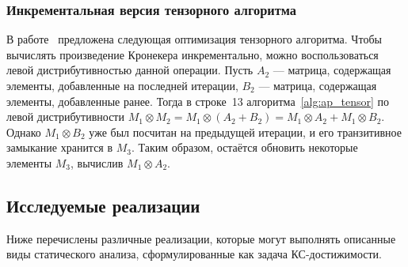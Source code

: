 \subsubsection{Инкрементальная версия тензорного алгоритма}

В работе~\cite{incremental_tensor_algorithm} предложена следующая оптимизация тензорного алгоритма. Чтобы вычислять произведение Кронекера инкрементально, можно воспользоваться левой дистрибутивностью данной операции. Пусть $A_2$ --- матрица, содержащая элементы, добавленные на последней итерации, $B_2$ --- матрица, содержащая элементы, добавленные ранее. Тогда в строке~13 алгоритма~\ref{alg:ap_tensor} по левой дистрибутивности $M_1 \otimes M_2 = M_1 \otimes (A_2 + B_2) = M_1 \otimes A_2 + M_1 \otimes B_2$. Однако $M_1 \otimes B_2$ уже был посчитан на предыдущей итерации, и его транзитивное замыкание хранится в $M_3$. Таким образом, остаётся обновить некоторые элементы $M_3$, вычислив $M_1 \otimes A_2$.

\subsection{Исследуемые реализации}
Ниже перечислены различные реализации, которые могут выполнять описанные виды статического анализа, сформулированные как задача КС-достижимости.

